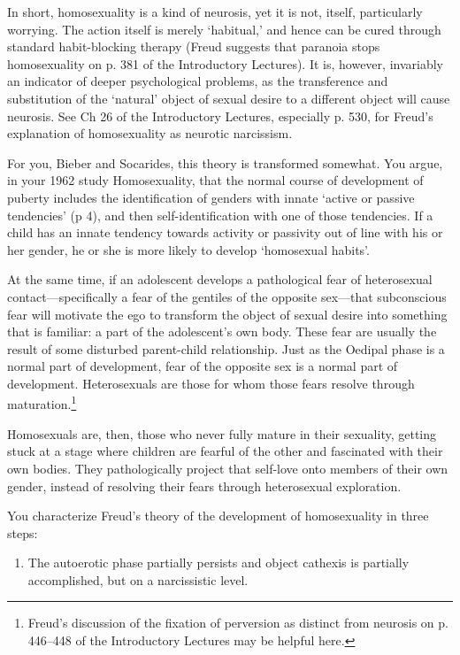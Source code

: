 \begin{refsection}
In short, homosexuality is a kind of neurosis, yet it is not, itself, particularly worrying. The action itself is merely `habitual,' and hence can be cured through standard habit-blocking therapy (Freud suggests that paranoia stops homosexuality on p. 381 of the Introductory Lectures). It is, however, invariably an indicator of deeper psychological problems, as the transference and substitution of the `natural' object of sexual desire to a different object will cause neurosis. See Ch 26 of the Introductory Lectures, especially p. 530, for Freud's explanation of homosexuality as neurotic narcissism.

For you, Bieber and Socarides, this theory is transformed somewhat. You argue, in your 1962 study Homosexuality, that the normal course of development of puberty includes the identification of genders with innate `active or passive tendencies' (p 4), and then self-identification with one of those tendencies. If a child has an innate tendency towards activity or passivity out of line with his or her gender, he or she is more likely to develop `homosexual habits'.

At the same time, if an adolescent develops a pathological fear of heterosexual contact—specifically a fear of the gentiles of the opposite sex—that subconscious fear will motivate the ego to transform the object of sexual desire into something that is familiar: a part of the adolescent's own body. These fear are usually the result of some disturbed parent-child relationship. Just as the Oedipal phase is a normal part of development, fear of the opposite sex is a normal part of development. Heterosexuals are those for whom those fears resolve through maturation.\footnote{Freud's discussion of the fixation of perversion as distinct from neurosis on p. 446--448 of the Introductory Lectures may be helpful here.}

Homosexuals are, then, those who never fully mature in their sexuality, getting stuck at a stage where children are fearful of the other and fascinated with their own bodies. They pathologically project that self-love onto members of their own gender, instead of resolving their fears through heterosexual exploration.

You characterize Freud's theory of the development of homosexuality in three steps:

\begin{enumerate}
\item The autoerotic phase partially persists and object cathexis is partially accomplished, but on a narcissistic level.


\end{enumerate}
\end{refsection}
